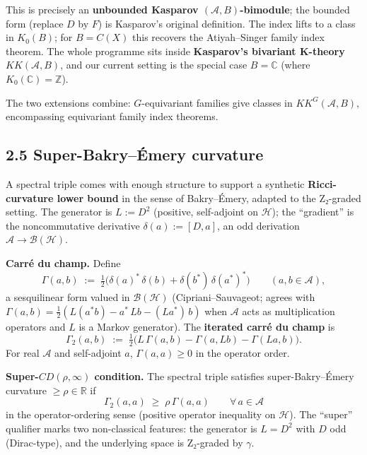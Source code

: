 \documentclass[
  11pt,
]{article}
\begin{document}
This is precisely an \textbf{unbounded Kasparov
\((\mathcal{A}, B)\)-bimodule}; the bounded form (replace \(D\) by
\(F\)) is Kasparov's original definition. The index lifts to a class in
\(K_0(B)\); for \(B = C(X)\) this recovers the Atiyah--Singer family
index theorem. The whole programme sits inside \textbf{Kasparov's
bivariant K-theory} \(KK(\mathcal{A}, B)\), and our current setting is
the special case \(B = \mathbb{C}\) (where
\(K_0(\mathbb{C}) = \mathbb{Z}\)).

The two extensions combine: \(G\)-equivariant families give classes in
\(KK^G(\mathcal{A}, B)\), encompassing equivariant family index
theorems.

\subsection{2.5 Super-Bakry--Émery
curvature}\label{super-bakryuxe9mery-curvature}

A spectral triple comes with enough structure to support a synthetic
\textbf{Ricci-curvature lower bound} in the sense of Bakry--Émery,
adapted to the Z₂-graded setting. The generator is \(L := D^2\)
(positive, self-adjoint on \(\mathcal{H}\)); the ``gradient'' is the
noncommutative derivative \(\delta(a) := [D, a]\), an odd derivation
\(\mathcal{A}\to \mathcal{B}(\mathcal{H})\).

\textbf{Carré du champ.} Define \[
\Gamma(a, b) \;:=\; \tfrac{1}{2}\bigl(\delta(a)^*\,\delta(b) + \delta(b^*)\,\delta(a^*)^*\bigr)
\qquad (a, b \in \mathcal{A}),
\] a sesquilinear form valued in \(\mathcal{B}(\mathcal{H})\)
(Cipriani--Sauvageot; agrees with
\(\Gamma(a, b) = \tfrac{1}{2}(L(a^*b) - a^*\,Lb - (La^*)\,b)\) when
\(\mathcal{A}\) acts as multiplication operators and \(L\) is a Markov
generator). The \textbf{iterated carré du champ} is \[
\Gamma_2(a, b) \;:=\; \tfrac{1}{2}\bigl(L\,\Gamma(a, b) - \Gamma(a, Lb) - \Gamma(La, b)\bigr).
\] For real \(\mathcal{A}\) and self-adjoint \(a\),
\(\Gamma(a, a) \geq 0\) in the operator order.

\textbf{Super-\(CD(\rho, \infty)\) condition.} The spectral triple
satisfies super-Bakry--Émery curvature \(\geq \rho \in \mathbb{R}\) if
\[
\Gamma_2(a, a) \;\geq\; \rho\,\Gamma(a, a) \qquad \forall\,a \in \mathcal{A}
\] in the operator-ordering sense (positive operator inequality on
\(\mathcal{H}\)). The ``super'' qualifier marks two non-classical
features: the generator is \(L = D^2\) with \(D\) odd (Dirac-type), and
the underlying space is Z₂-graded by \(\gamma\).
\end{document}
